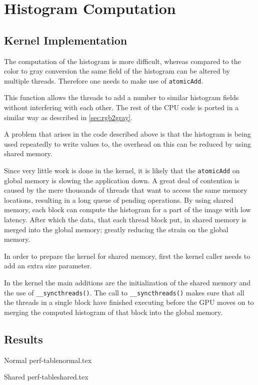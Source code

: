 \documentclass[final]{report}
\begin{document}
\chapter{Histogram Computation}

\section{Kernel Implementation}
The computation of the histogram is more difficult, whereas compared to the color to gray conversion the same field of the histogram can be altered by multiple threads.
Therefore one needs to make use of \texttt{atomicAdd\(\)}.


This function allows the threads to add a number to similar histogram fields without interfering with each other.
The rest of the CPU code is ported in a similar way as described in \cref{sec:rgb2gray}.

A problem that arises in the code described above is that the histogram is being used repeatedly to write values to, the overhead on this can be reduced by using shared memory.

Since very little work is done in the kernel, it is likely that the \texttt{atomicAdd\(\)} on global memory is slowing the application down.
A great deal of contention is caused by the mere thousands of threads that want to access the same memory locations, resulting in a long queue of pending operations.
By using shared memory, each block can compute the histogram for a part of the image with low latency.
After which the data, that each thread block put, in shared memory is merged into the global memory; greatly reducing the strain on the global memory.

In order to prepare the kernel for shared memory, first the kernel caller needs to add an extra size parameter.


In the kernel the main additions are the initialization of the shared memory and the use of \texttt{\_\_syncthreads()}.
The call to \texttt{\_\_syncthreads()} makes sure that all the threads in a single block have finished executing before the GPU moves on to merging the computed histogram of that block into the global memory.


\section{Results}
Normal
{perf-tablenormal.tex}

Shared
{perf-tableshared.tex}
\end{document}
